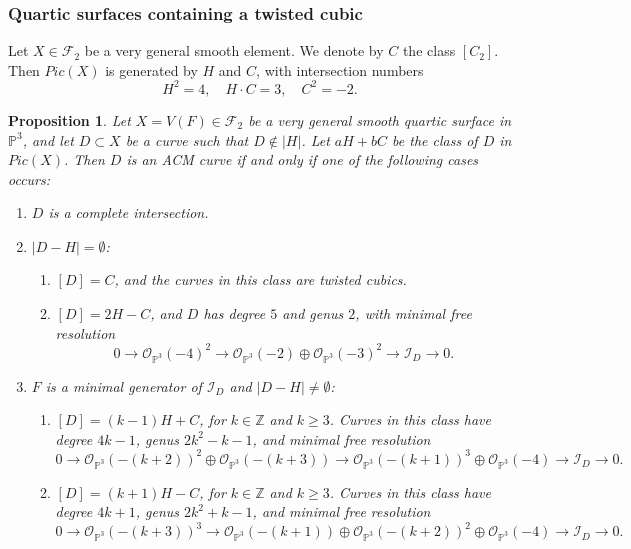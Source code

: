 \documentclass[12pt,reqno]{amsart}
\theoremstyle{plain}
\newtheorem{prop}[theorem]{Proposition}
\theoremstyle{definition}
\theoremstyle{remark}
\theoremstyle{definition}
\newcommand{\PP}{\mathds{P}}
\newcommand{\PPP}{\PP^{3}}
\newcommand{\ii}{\mathscr{I}}
\newcommand{\oo}{\mathcal{O}}
\begin{document}
\subsubsection{\textbf{Quartic surfaces containing a twisted cubic}}
Let $X \in \mathcal{F}_{2}$ be a very general smooth element. We denote by $C$ the class $[C_{2}]$. Then $Pic(X)$ is generated by $H$ and $C$, with intersection numbers
\[
H^{2} = 4, \quad H \cdot C = 3, \quad C^{2} = -2.
\]

\begin{prop}
Let $X = V(F) \in \mathcal{F}_{2}$ be a very general smooth quartic surface in $\PPP$, and let $D \subset X$ be a curve such that $D \notin |H|$. Let $aH + bC$ be the class of $D$ in $Pic(X)$. Then $D$ is an ACM curve if and only if one of the following cases occurs:
\begin{enumerate}[label=(\roman*)]
    \item $D$ is a complete intersection.

    \item $|D-H| = \emptyset$:
    \begin{enumerate}
        \item[(a)] $[D] = C$, and the curves in this class are twisted cubics.
        \item[(b)] $[D] = 2H - C$, and $D$ has degree $5$ and genus $2$, with minimal free resolution
        \[
        0 \to \mathcal{O}_{\PPP}(-4)^{2} \to \mathcal{O}_{\PPP}(-2) \oplus \mathcal{O}_{\PPP}(-3)^{2} \to \mathscr{I}_{D} \to 0.
        \]
    \end{enumerate}

    \item $F$ is a minimal generator of $\mathscr{I}_{D}$ and $|D-H| \neq \emptyset$:
    \begin{enumerate}
        \item[(a)] $[D] = (k-1)H + C$, for $k \in \mathds{Z}$ and $k \geq 3$. Curves in this class have degree $4k-1$, genus $2k^{2}-k-1$, and minimal free resolution
        \[
        0 \to \oo_{\PPP}(-(k+2))^{2} \oplus \oo_{\PPP}(-(k+3)) \to \oo_{\PPP}(-(k+1))^{3} \oplus \oo_{\PPP}(-4) \to \ii_{D} \to 0.
        \]

        \item[(b)] $[D] = (k+1)H - C$, for $k \in \mathds{Z}$ and $k \geq 3$. Curves in this class have degree $4k+1$, genus $2k^{2}+k-1$, and minimal free resolution
        \[
        0 \to \oo_{\PPP}(-(k+3))^{3} \to \oo_{\PPP}(-(k+1)) \oplus \oo_{\PPP}(-(k+2))^{2} \oplus \oo_{\PPP}(-4) \to \ii_{D} \to 0.
        \]
    \end{enumerate}


\end{enumerate}
\end{prop}
\end{document}
